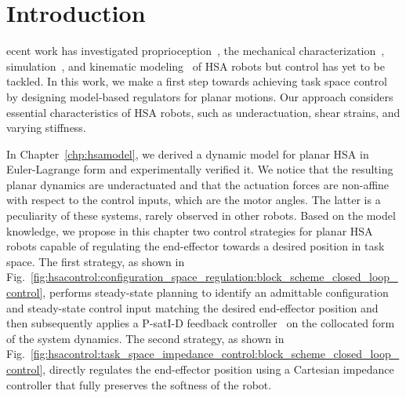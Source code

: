\section{Introduction}
ecent work has investigated proprioception~\citep{zhang2022vision}, the mechanical characterization~\citep{good2022expanding}, simulation~\citep{stolzle2023modelling}, and kinematic modeling~\citep{garg2022kinematic, stolzle2023modelling} of \gls{HSA} robots but control has yet to be tackled.
In this work, we make a first step towards achieving task space control by designing model-based regulators for planar motions. Our approach considers essential characteristics of \gls{HSA} robots, such as underactuation, shear strains, and varying stiffness. %

In Chapter~\ref{chp:hsamodel}, we derived a dynamic model for planar \gls{HSA} in Euler-Lagrange form and experimentally verified it.
We notice that the resulting planar dynamics are underactuated and that the actuation forces are non-affine with respect to the control inputs, which are the motor angles. The latter is a peculiarity of these systems, rarely observed in other robots.
Based on the model knowledge, we propose in this chapter two control strategies for planar \gls{HSA} robots capable of regulating the end-effector towards a desired position in task space.
The first strategy, as shown in Fig.~\ref{fig:hsacontrol:configuration_space_regulation:block_scheme_closed_loop_control}, performs steady-state planning to identify an admittable configuration and steady-state control input matching the desired end-effector position and then subsequently applies a P-satI-D feedback controller~\citep{pustina2022p} on the collocated form~\citep{pustina2024input} of the system dynamics.
The second strategy, as shown in Fig.~\ref{fig:hsacontrol:task_space_impedance_control:block_scheme_closed_loop_control}, directly regulates the end-effector position using a Cartesian impedance controller that fully preserves the softness of the robot.

